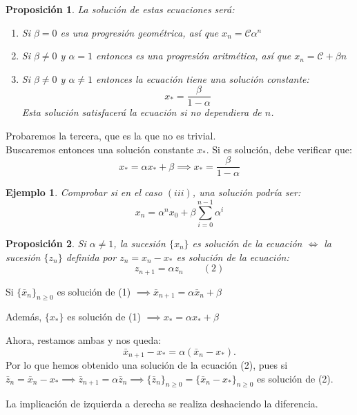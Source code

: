 \documentclass[11pt, a4paper, titlepage]{article}
\makeatletter
\renewenvironment{proof}[1][\proofname] {\vspace{-15pt}\par\pushQED{\qed}\normalfont\topsep6\p@\@plus6\p@\relax\trivlist\item[\hskip\labelsep\it#1\@addpunct{.}]\ignorespaces}{\popQED\endtrivlist\@endpefalse}
\theoremstyle{theorem-style}
\newtheorem*{nprop}{Proposición}
\theoremstyle{definition-style}
\theoremstyle{remark-style}
\theoremstyle{example-style}
\newtheorem*{ejemplo}{Ejemplo}
\newenvironment{nlist}
{\begin{enumerate}
\renewcommand\labelenumi{(\emph{\roman{enumi})}}}
{\end{enumerate}}
\makeatother
\begin{document}
\begin{nprop}
	La solución de estas ecuaciones será:
	\begin{nlist}
	\item Si $\beta = 0$ es una progresión geométrica, así que $x_n =  \mathcal{C} \alpha^n$
	\item Si $\beta \ne 0$ y $\alpha  = 1$ entonces es una progresión aritmética, así que $x_n = \mathcal{C} + \beta n$
	\item Si $\beta \ne 0 $ y $\alpha \ne 1 $ entonces la ecuación tiene una solución constante:
	\[
	x_* = \frac{\beta}{1-\alpha}
	\]
	Esta solución satisfacerá la ecuación si no dependiera de $n$.
\end{nlist}
\end{nprop}
\begin{proof}
	Probaremos la tercera, que es la que no es trivial.\\
	Buscaremos entonces una solución constante $x_*$. Si es solución, debe verificar que:
$$x_* =  \alpha x_* + \beta \implies  x_* = \dfrac{\beta}{1 - \alpha}$$
\end{proof}

\begin{ejemplo}
	Comprobar si en el caso $(iii)$, una solución podría ser: \[x_n = \alpha^n x_0 + \beta \sum_{i=0}^{n-1}\alpha^i\]
\end{ejemplo}


\begin{nprop}
	Si $\alpha \ne 1$, la sucesión $\{x_n\}$ es solución de la ecuación $\iff$ la sucesión $\{z_n\}$ definida por $z_n = x_n - x_*$ es solución de la ecuación:
	\[
	z_{n+1} =  \alpha z_n\quad \quad (2)
	\]
\end{nprop}
\begin{proof}
	Si $\{\bar{x}_n\}_{n\geq 0}$ es solución de (1) $\implies \bar{x}_{n+1}= \alpha\bar{x}_n+\beta$
	
	
	Además, $\{x_*\}$ es solución de (1) $\implies x_*= \alpha x_*+\beta$
	
	Ahora, restamos ambas y nos queda:
	\[
	\bar{x}_{n+1} - x_*= \alpha (\bar{x}_n - x_*).
	\]
	Por lo que hemos obtenido una solución de la ecuación (2), pues si $\bar{z}_n= \bar{x}_n - x_*\implies \bar{z}_{n+1}= \alpha \bar{z}_n \implies \{\bar{z}_n\}_{n \ge 0} = \{\bar{x}_n - x_*\}_{n \ge 0}$ es solución de (2).
	
	La implicación de izquierda a derecha se realiza deshaciendo la diferencia.
	
\end{proof}
\end{document}
